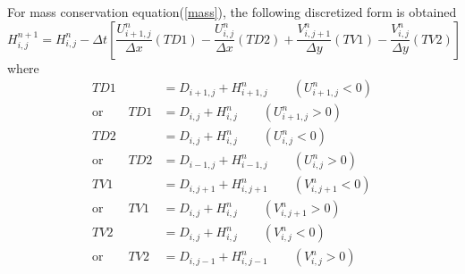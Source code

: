 \documentclass[10pt,a4paper]{article}
\begin{document}
For mass conservation equation(\ref{mass}), the following discretized form is obtained
\begin{equation}
	H_{i, j}^{n+1} = H_{i, j}^n - \Delta t\left[\frac{U_{i+1, j}^n}{\Delta x}(TD1) - \frac{U_{i, j}^n}{\Delta x}(TD2) + \frac{V_{i, j+1}^n}{\Delta y}(TV1) - \frac{V_{i, j}^n}{\Delta y}(TV2)\right]
\end{equation}
where
\begin{equation}
	\begin{aligned}
		TD1 &= D_{i+1, j} + H_{i+1, j}^n\qquad (U_{i+1, j}^n < 0)\\
		\mbox{or} \qquad TD1 &= D_{i, j} + H_{i, j}^n\qquad (U_{i+1, j}^n > 0)\\
		TD2 &= D_{i, j} + H_{i, j}^n\qquad (U_{i, j}^n < 0) \\
		\mbox{or} \qquad TD2 &= D_{i-1, j} + H_{i-1, j}^n\qquad (U_{i, j}^n > 0) \\
		TV1 &= D_{i, j+1} + H_{i, j+1}^n\qquad (V_{i, j+1}^n < 0)\\
		\mbox{or} \qquad TV1 &= D_{i, j} + H_{i, j}^n\qquad (V_{i, j+1}^n > 0)\\
		TV2 &= D_{i, j} + H_{i, j}^n\qquad (V_{i, j}^n < 0)\\
		\mbox{or} \qquad TV2 &= D_{i, j-1} + H_{i, j-1}^n\qquad (V_{i, j}^n > 0)
	\end{aligned}
\end{equation}
\end{document}
